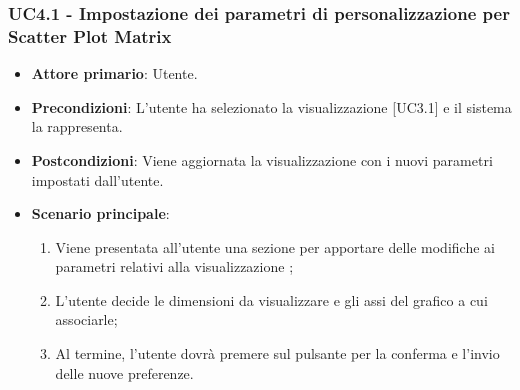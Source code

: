 \subsubsection{UC4.1 - Impostazione dei parametri di personalizzazione per Scatter Plot Matrix}
\begin{itemize}
	\item \textbf{Attore primario}: Utente.
	\item \textbf{Precondizioni}: L'utente ha selezionato la visualizzazione  [UC3.1] e il sistema la rappresenta.
	\item \textbf{Postcondizioni}: Viene aggiornata la visualizzazione  con i nuovi parametri impostati dall'utente.
	\item \textbf{Scenario principale}:
	\begin{enumerate}
			\item Viene presentata all'utente una sezione per apportare delle modifiche ai parametri relativi alla visualizzazione ;
			\item L'utente decide le dimensioni da visualizzare e gli assi del grafico a cui associarle;
			\item Al termine, l'utente dovrà premere sul pulsante per la conferma e l'invio delle nuove preferenze.
		\end{enumerate}
\end{itemize}